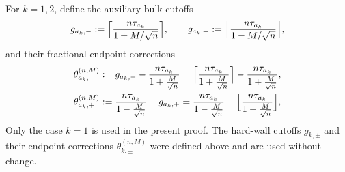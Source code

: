 \documentclass[a4paper]{article}
\numberwithin{equation}{section}
\begin{document}
For $k=1,2$, define the auxiliary bulk cutoffs
\[
g_{a_k,-}:=\Bigl\lceil\frac{n\tau_{a_k}}{1+M/\sqrt n}\Bigr\rceil,
\qquad
g_{a_k,+}:=\Bigl\lfloor\frac{n\tau_{a_k}}{1-M/\sqrt n}\Bigr\rfloor,
\]
and their fractional endpoint corrections
\begin{align*}
\theta_{a_k,-}^{(n,M)}&:=g_{a_k,-}
-\frac{n\tau_{a_k}}{1+\frac{M}{\sqrt{n}}}
=
\Bigl\lceil\frac{n\tau_{a_k}}{1+\frac{M}{\sqrt{n}}}\Bigr\rceil
-\frac{n\tau_{a_k}}{1+\frac{M}{\sqrt{n}}}, 
\\
\theta_{a_k,+}^{(n,M)}&:=\frac{n\tau_{a_k}}{1-\frac{M}{\sqrt{n}}}-g_{a_k,+}
=\frac{n\tau_{a_k}}{1-\frac{M}{\sqrt{n}}}-\Bigl\lfloor\frac{n\tau_{a_k}}{1-\frac{M}{\sqrt{n}}}\Bigr\rfloor,  
\end{align*}
Only the case $k=1$ is used in the present proof.  The hard-wall cutoffs
$g_{k,\pm}$ and their endpoint corrections $\theta_{k,\pm}^{(n,M)}$ were
defined above and are used without change.
\end{document}
